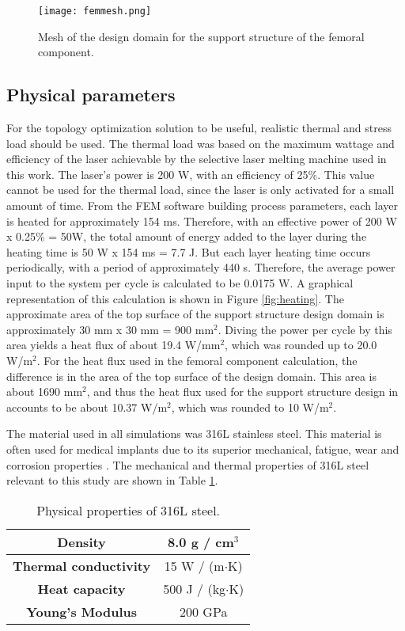 \documentclass[../main.tex]{subfiles}
\begin{document}
\begin{figure}[h!]
  \texttt{[image: femmesh.png]}
  \caption{Mesh of the design domain for the support structure of the femoral component.}
  \label{fig:mesh3d}
\end{figure}

\subsection{Physical parameters}

For the topology optimization solution to be useful, realistic thermal and stress load should be used. The thermal load was based on the maximum wattage and efficiency of the laser achievable by the selective laser melting machine used in this work. The laser's power is 200 W, with an efficiency of 25\%. This value cannot be used for the thermal load, since the laser is only activated for a small amount of time. From the FEM software building process parameters, each layer is heated for approximately 154 ms. Therefore, with an effective power of 200 W x 0.25\% = 50W, the total amount of energy added to the layer during the heating time is 50 W x 154 ms = 7.7 J. But each layer heating time occurs periodically, with a period of approximately 440 s. Therefore, the average power input to the system per cycle is calculated to be 0.0175 W. A graphical representation of this calculation is shown in Figure \ref{fig:heating}. The approximate area of the top surface of the support structure design domain is approximately 30 mm x 30 mm = 900 mm$^2$. Diving the power per cycle by this area yields a heat flux of about 19.4 W/mm$^2$, which was rounded up to 20.0 W/m$^2$. For the heat flux used in the femoral component calculation, the difference is in the area of the top surface of the design domain. This area is about 1690 mm$^2$, and thus the heat flux used for the support structure design in accounts to be about 10.37 W/m$^2$, which was rounded to 10 W/m$^2$. 

The material used in all simulations was 316L stainless steel. This material is often used for medical implants due to its superior mechanical, fatigue, wear and corrosion properties \cite{davisComprehensiveReviewMetallic2022}. The mechanical and thermal properties of 316L steel relevant to this study are shown in Table \ref{tab:316l}.

\begin{table}[h!]
  \centering
  \begin{tabular} { |c | c| }
    \hline
    \textbf{Density} & 8.0 g / cm$^3$ \\
    \hline
    \textbf{Thermal conductivity} & 15 W / (m$\cdot$K) \\
    \hline
    \textbf{Heat capacity} & 500 J / (kg$\cdot$K) \\
    \hline
    \textbf{Young's Modulus} & 200 GPa \\
    \hline
  \end{tabular}
  \caption{Physical properties of 316L steel.}
  \label{tab:316l}
\end{table}
\end{document}
